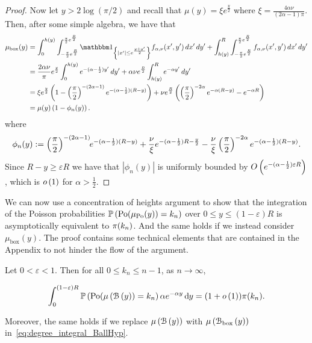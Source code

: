 \begin{proof}
Now let $y > 2 \log(\pi/2)$ and recall that $\mu(y) = \xi e^{\frac{y}{2}}$ where $\xi = \frac{4\alpha \nu}{(2\alpha - 1)\pi}$. Then, after some simple algebra, we have that
\begin{align*}
	\mu_{\mathrm{box}}(y)
	&= \int_0^{h(y)} \int_{-\frac{\pi}{2}e^{\frac{R}{2}}}^{\frac{\pi}{2}e^{\frac{R}{2}}} 
		\ind{|x^\prime| \le e^{\frac{y+y^\prime}{2}}} f_{\alpha,\nu}(x^\prime,y^\prime) \, dx^\prime \, dy^\prime
		+ \int_{h(y)}^{R} \int_{-\frac{\pi}{2}e^{\frac{R}{2}}}^{\frac{\pi}{2}e^{\frac{R}{2}}} 
		f_{\alpha,\nu}(x^\prime,y^\prime) \, dx^\prime \, dy^\prime\\
	&= \frac{2 \alpha \nu}{\pi} e^{\frac{y}{2}} \int_0^{h(y)} e^{-(\alpha - \frac{1}{2})y^\prime} \, dy^\prime
		+ \alpha \nu e^{\frac{R}{2}} \int_{h(y)}^{R} e^{-\alpha y^\prime} \, dy^\prime \\
	&= \xi e^{\frac{y}{2}}\left(1 - \left(\frac{\pi}{2}\right)^{-(2\alpha - 1)} 
		e^{-(\alpha - \frac{1}{2})(R - y)}\right)
	+ \nu e^{\frac{R}{2}}\left(\left(\frac{\pi}{2}\right)^{-2\alpha} e^{-\alpha(R - y)} 
		- e^{-\alpha R}\right)\\
	&= \mu(y)\left(1 - \phi_n(y) \right).
\end{align*}
where 
\[
	\phi_n(y) :=  \left(\frac{\pi}{2}\right)^{-(2\alpha - 1)} \hspace{-3pt} e^{-(\alpha - \frac{1}{2})(R - y)}
				+ \frac{\nu}{\xi}e^{-(\alpha - \frac{1}{2})R - \frac{y}{2}} - \frac{\nu}{\xi}\left(\frac{\pi}{2}\right)^{-2\alpha} e^{-(\alpha-\frac{1}{2})(R - y)}.
\]
Since $R - y \ge \varepsilon R$ we have that $|\phi_n(y)|$ is uniformly bounded by
$O\left(e^{-(\alpha - \frac{1}{2})\varepsilon R}\right)$, which is $o\left(1\right)$ for $\alpha > \frac{1}{2}$. 
\end{proof}

We can now use a concentration of heights argument to show that the integration of the Poisson probabilities $\mathbb{P}\left({\mathrm{Po}}(\mu_{{\mathrm{Po}}}(y)) = k_n\right)$ over $0 \le y \le (1-\varepsilon) R$ is asymptotically equivalent to ${\pi}(k_n)$. And the same holds if we instead consider $\mu_{\mathrm{box}}(y)$. The proof contains some technical elements that are contained in the Appendix to not hinder the flow of the argument. 

\begin{lemma}\label{lem:degree_integral}
Let $0 < \varepsilon < 1$. Then for all $0 \le k_n \le n - 1$, as $n \to \infty$,

\begin{equation}\label{eq:degree_integral_BallHyp}
	\int_0^{(1-\varepsilon)R} \mathbb{P}\left({\mathrm{Po}}(\mu\left({\mathcal B}\left(y\right)\right) = k_n\right) \alpha e^{-\alpha y} \operatorname{\mathrm{d}\hspace{-2pt}} y
	= (1+o\left(1\right)) {\pi}(k_n).
\end{equation}

Moreover, the same holds if we replace $\mu\left({\mathcal B}\left(y\right)\right)$ with $\mu\left({\mathcal B}_{\text{box}}\left(y\right)\right)$ in~\eqref{eq:degree_integral_BallHyp}.
\end{lemma}

